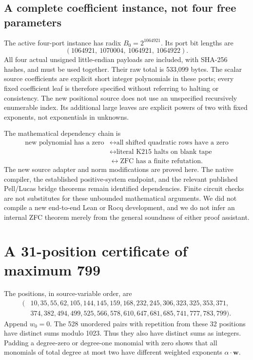 \documentclass[11pt]{article}
\begin{document}
\subsection{A complete coefficient instance, not four free parameters}

The active four-port instance has radix $B_0=2^{1064921}$. Its port bit lengths
are
\[
 (1064921,\ 1070004,\ 1064921,\ 1064922).
\]
All four actual unsigned little-endian payloads are included, with SHA-256
hashes, and must be used together. Their raw total is 533,099 bytes.
The scalar source coefficients are explicit short integer polynomials in these
ports; every fixed coefficient leaf is therefore specified without referring
to halting or consistency. The new positional source does not use an unspecified
recursively enumerable index. Its additional large leaves are explicit powers
of two with fixed exponents, not exponentials in unknowns.

The mathematical dependency chain is
\[
\begin{split}
\text{new polynomial has a zero}
&\longleftrightarrow\text{all shifted quadratic rows have a zero}\\
&\longleftrightarrow\text{literal K215 halts on blank tape}\\
&\longleftrightarrow\text{ZFC has a finite refutation}.
\end{split}
\]
The new source adapter and norm modifications are proved here. The native
compiler, the established positive-system endpoint, and the relevant published
Pell/Lucas bridge theorems remain identified dependencies. Finite circuit checks
are not substitutes for these unbounded mathematical arguments. We did not
compile a new end-to-end Lean or Rocq development, and we do not infer an internal
ZFC theorem merely from the general soundness of either proof assistant.

\section{A 31-position certificate of maximum 799}

The positions, in source-variable order, are
\begin{equation}\label{eq:weights}
\begin{split}
(&10,35,55,62,105,144,145,159,168,232,245,306,323,325,353,371,\\
 &374,382,494,499,525,566,578,610,647,681,685,741,777,783,799).
\end{split}
\end{equation}
Append $w_0=0$. The 528 unordered pairs with repetition from these 32
positions have distinct sums modulo 1023. Thus they also have distinct sums
as integers. Padding a degree-zero or degree-one monomial with zero shows
that all monomials of total degree at most two have different weighted
exponents $\alpha\cdot\mathbf w$.
\end{document}
